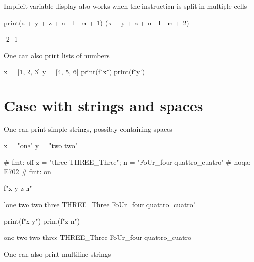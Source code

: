 \documentclass[oneside]{book}
\begin{document}
Implicit variable display also works when the instruction is split in multiple cells
\begin{pycell}
print(x + y + z + n - l - m + 1)
(x + y + z + n - l - m + 2)
\end{pycell}
\begin{pyexpectedoutput}
-2
-1
\end{pyexpectedoutput}

\begin{mdcell}
One can also print lists of numbers
\end{mdcell}

\begin{pycell}
x = [1, 2, 3]
y = [4, 5, 6]
print(f"{x}")
print(f"{y}")
\end{pycell}
\begin{pyexpectedoutput}
[1, 2, 3]
[4, 5, 6]
\end{pyexpectedoutput}

\chapter{Case with strings and spaces}

\begin{mdcell}
One can print simple strings, possibly containing spaces
\end{mdcell}

\begin{pycell}
x = "one"
y = "two two"
\end{pycell}

\begin{pycell}
# fmt: off
z = "three THREE_Three"; n = "FoUr_four quattro_cuatro"  # noqa: E702
# fmt: on
\end{pycell}

\begin{pycell}
f"{x} {y} {z} {n}"
\end{pycell}
\begin{pyexpectedoutput}
'one two two three THREE_Three FoUr_four quattro_cuatro'
\end{pyexpectedoutput}

\begin{pycell}
print(f"{x} {y}")
print(f"{z} {n}")
\end{pycell}
\begin{pyexpectedoutput}
one two two
three THREE_Three FoUr_four quattro_cuatro
\end{pyexpectedoutput}

\begin{mdcell}
One can also print multiline strings
\end{mdcell}
\end{document}
